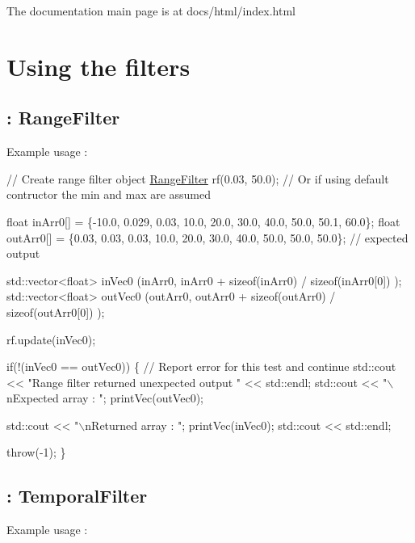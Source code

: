 The documentation main page is at docs/html/index.\+html\hypertarget{index_usage_sec}{}\section{Using the filters}\label{index_usage_sec}
\hypertarget{index_rangeFilter}{}\subsection{\+: Range\+Filter}\label{index_rangeFilter}
Example usage \+: 
\begin{DoxyCodeInclude}
    
    \textcolor{comment}{// Create range filter object}
    \hyperlink{class_range_filter}{RangeFilter} rf(0.03, 50.0); \textcolor{comment}{// Or if using default contructor the min and max are assumed}
    
    \textcolor{keywordtype}{float} inArr0[] = \{-10.0, 0.029, 0.03, 10.0, 20.0, 30.0, 40.0, 50.0, 50.1, 60.0\};
    \textcolor{keywordtype}{float} outArr0[] = \{0.03, 0.03, 0.03, 10.0, 20.0, 30.0, 40.0, 50.0, 50.0, 50.0\}; \textcolor{comment}{// expected output}
    
    std::vector<float> inVec0 (inArr0, inArr0 + \textcolor{keyword}{sizeof}(inArr0) / \textcolor{keyword}{sizeof}(inArr0[0]) );
    std::vector<float> outVec0 (outArr0, outArr0 + \textcolor{keyword}{sizeof}(outArr0) / \textcolor{keyword}{sizeof}(outArr0[0]) );
    
    rf.update(inVec0);
    
    \textcolor{keywordflow}{if}(!(inVec0 == outVec0)) \{
        \textcolor{comment}{// Report error for this test and continue}
        std::cout << \textcolor{stringliteral}{"Range filter returned unexpected output "} << std::endl;
        std::cout << \textcolor{stringliteral}{"\(\backslash\)nExpected array : "};
        printVec(outVec0);
        
        std::cout << \textcolor{stringliteral}{"\(\backslash\)nReturned array : "};
        printVec(inVec0);
        std::cout << std::endl;
        
        \textcolor{keywordflow}{throw}(-1);
    \}
\end{DoxyCodeInclude}
 \hypertarget{index_temporalFilter}{}\subsection{\+: Temporal\+Filter}\label{index_temporalFilter}
Example usage \+: 
